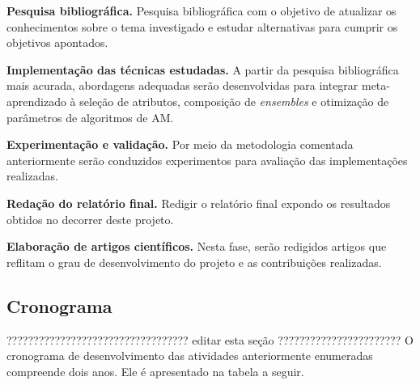 \begin{compactenum}

\item{\textbf{Pesquisa bibliográfica.} Pesquisa bibliográfica com o objetivo de atualizar os conhecimentos sobre o
tema investigado e estudar alternativas para cumprir os objetivos apontados.}

\item{\textbf{Implementação das técnicas estudadas.} A partir da pesquisa bibliográfica mais acurada, abordagens adequadas serão desenvolvidas para integrar meta-aprendizado à seleção de atributos, composição de \textit{ensembles} e otimização de parâmetros de algoritmos de AM.}

\item{\textbf{Experimentação e validação.} Por meio da metodologia comentada anteriormente serão conduzidos experimentos para avaliação das implementações realizadas.}

\item {\textbf{Redação do relatório final.} Redigir o relatório final expondo os resultados obtidos no decorrer deste projeto.}

\item{\textbf{Elaboração de artigos científicos.} Nesta fase, serão redigidos artigos que reflitam o grau de desenvolvimento do projeto e as contribuições realizadas.}
\end{compactenum}

\subsection{Cronograma}\label{ssec:Cronograma}
??????????????????????????????????
editar esta seção
???????????????????????
O cronograma de desenvolvimento das atividades anteriormente enumeradas
compreende dois anos. Ele é apresentado na tabela a seguir.

\newcommand{\y}{\rule{13pt}{5pt}}
\newcommand{\x}{\hspace*{4pt}}
\setlength{\tabcolsep}{0pt}


